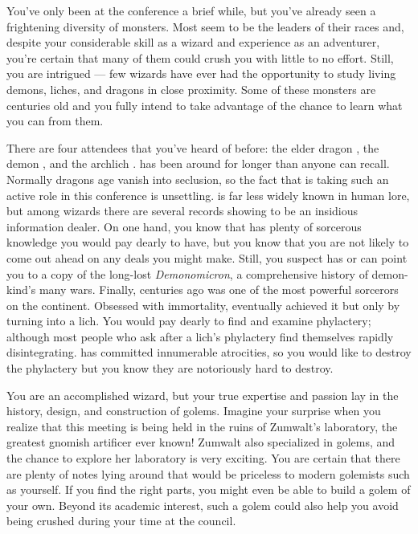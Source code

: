 \documentclass[char]{guildcamp2}
\begin{document}
You've only been at the conference a brief while, but you've already seen a frightening diversity of monsters. Most seem to be the leaders of their races and, despite your considerable skill as a wizard and experience as an adventurer, you're certain that many of them could crush you with little to no effort. Still, you are intrigued --- few wizards have ever had the opportunity to study living demons, liches, and dragons in close proximity. Some of these monsters are centuries old and you fully intend to take advantage of the chance to learn what you can from them.

There are four attendees that you've heard of before: the elder dragon \cOnyx{}, the demon \cDemon{\intro}, and the archlich \cLich{\intro}. \cOnyx{} has been around for longer than anyone can recall. Normally dragons \cOnyx{\their} age vanish into seclusion, so the fact that \cOnyx{\they} is taking such an active role in this conference is unsettling. \cDemon{} is far less widely known in human lore, but among wizards there are several records showing \cDemon{\them} to be an insidious information dealer. On one hand, you know that \cDemon{\they} has plenty of sorcerous knowledge you would pay dearly to have, but you know that you are not likely to come out ahead on any deals you might make. Still, you suspect \cDemon{} has or can point you to a copy of the long-lost \emph{Demonomicron}, a comprehensive history of demon-kind's many wars. Finally, centuries ago \cLich{} was one of the most powerful sorcerors on the continent. Obsessed with immortality, \cLich{\they} eventually achieved it but only by turning into a lich. You would pay dearly to find and examine \cLich{\their} phylactery; although most people who ask after a lich's phylactery find themselves rapidly disintegrating. \cLich{} has committed innumerable atrocities, so you would like to destroy the phylactery but you know they are notoriously hard to destroy.

You are an accomplished wizard, but your true expertise and passion lay in the history, design, and construction of golems. Imagine your surprise when you realize that this meeting is being held in the ruins of Zumwalt's laboratory, the greatest gnomish artificer ever known! Zumwalt also specialized in golems, and the chance to explore her laboratory is very exciting. You are certain that there are plenty of notes lying around that would be priceless to modern golemists such as yourself. If you find the right parts, you might even be able to build a golem of your own. Beyond its academic interest, such a golem could also help you avoid being crushed during your time at the council.
\end{document}
